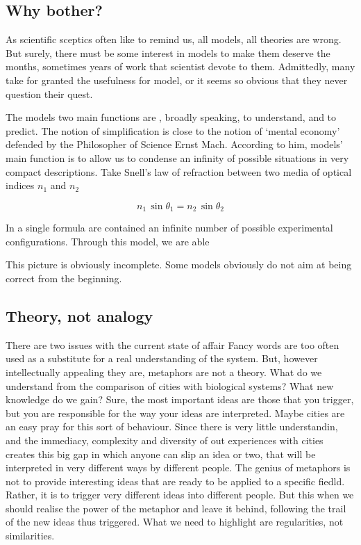 \subsection{Why bother?}
\label{sub:why_bother_}

As scientific sceptics often like to remind us, all models, all theories are
wrong. But surely, there must be some interest in models to make them deserve
the months, sometimes years of work that scientist devote to them. Admittedly,
many take for granted the usefulness for model, or it seems so obvious that they
never question their quest.

The models two main functions are , broadly speaking, to understand, and to
predict.  The notion of simplification is close to the notion of `mental
economy' defended by the Philosopher of Science Ernst Mach.  According to him,
models' main function is to allow us to condense an infinity of possible
situations in very compact descriptions. Take Snell's law of refraction between
two media of optical indices $n_1$ and $n_2$

\begin{equation}
    n_1\,\sin \theta_1 = n_2\,\sin \theta_2
\end{equation}

In a single formula are contained an infinite number of possible experimental
configurations. Through this model, we are able

This picture is obviously incomplete. Some models obviously do not aim at being
correct from the beginning.

\subsection{Theory, not analogy}
\label{sub:theory_not_analogy}




There are two issues with the current state of affair 
Fancy words are too often used as a substitute for a real
understanding of the system. But, however intellectually appealing they are,
metaphors are not a theory. What do we understand from the comparison of cities
with biological systems? What new knowledge do we gain? Sure, the most important
ideas are those that you trigger, but you are responsible for the way your ideas
are interpreted.  Maybe cities are an easy pray for this sort of behaviour.
Since there is very little understandin, and the immediacy, complexity and
diversity of out experiences with cities creates this big gap in which anyone
can slip an idea or two, that will be interpreted in very different ways by
different people. The genius of metaphors is not to provide interesting ideas
that are ready to be applied to a specific fiedld. Rather, it is to trigger very
different ideas into different people. But this when we should realise the power
of the metaphor and leave it behind, following the trail of the new ideas thus
triggered. What we need to highlight are regularities, not similarities.

